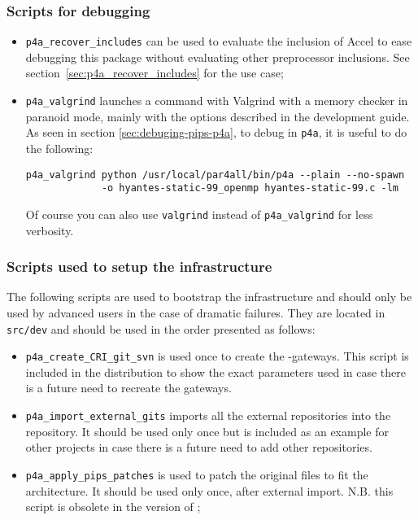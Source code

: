 \documentclass[a4paper]{article}
\begin{document}
\subsubsection{Scripts for debugging}
\label{sec:scripts-debugging}

\begin{itemize}
\item \verb|p4a_recover_includes| can be used to evaluate the inclusion of
  \Apfa Accel to ease debugging this package without evaluating other
  preprocessor inclusions. See section~\ref{sec:p4a_recover_includes} for
  the use case;
\item \verb|p4a_valgrind| launches a command with Valgrind with a memory
  checker in paranoid mode, mainly with the options described in the
  \Apips development guide. As seen in section
  \ref{sec:debuging-pips-p4a}, to debug \Apips in \texttt{p4a}, it is
  useful to do the following:
\begin{verbatim}
p4a_valgrind python /usr/local/par4all/bin/p4a --plain --no-spawn
             -o hyantes-static-99_openmp hyantes-static-99.c -lm
\end{verbatim}
  Of course you can also use \texttt{valgrind} instead of
  \verb/p4a_valgrind/ for less verbosity.
\end{itemize}


\subsubsection{Scripts used to setup the infrastructure}
\label{sec:scripts-used-setup}

The following scripts are used to
bootstrap the \Apfa infrastructure and should only be used by advanced
users in the case of dramatic failures.
They are located in
\texttt{src/dev} and should be used in the order presented as follows:
\begin{itemize}
\item \verb/p4a_create_CRI_git_svn/ is used once to create the \Apips{}
  \Asvn-\Agit gateways. This script is included in the distribution to
  show the exact parameters used in case there is a future need
  to recreate the gateways.
\item \verb/p4a_import_external_gits/ imports all the external \Agit
  repositories into the \Apfa{} \Agit repository. It should be used only
  once but is included as an example for other projects in case there is
  a future need to add other repositories.
\item \verb/p4a_apply_pips_patches/ is used to patch the original \Apips
  files to fit the \Apfa architecture. It should be used only once, after
  external \Agit import. N.B. this script is obsolete in the
  \Aautotools version of \Apips;
\end{itemize}
\end{document}
